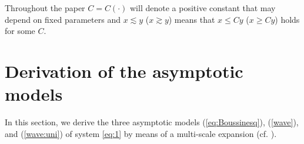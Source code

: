 \documentclass[final,11pt,a4paper,reqno]{amsart}
\theoremstyle{definition}
\begin{document}
Throughout the paper $C = C(\cdot)$ will denote a positive constant that may depend on fixed parameters  and  $x \lesssim y$ ($x \gtrsim y$) means that $x\le C y$ ($x\ge C y$) holds for some $C$. 


	




\section{Derivation of the asymptotic models}\label{sec:deri}
In this section, we derive the three asymptotic models (\ref{eq:Boussinesq}), (\ref{wave}), and (\ref{wave:uni}) of system \eqref{eq:1} by means of a multi-scale expansion (cf.  \cite{CL14,CL15,CLS12,CGSW18,granero2018asymptotic,GS}). 
\end{document}
